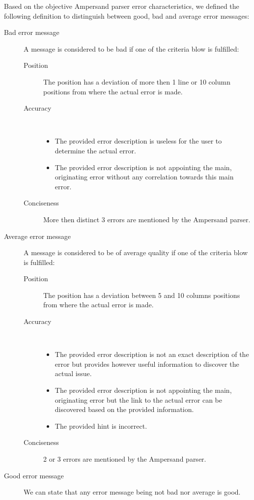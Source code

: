%
Based on the objective Ampersand parser error characteristics, we defined the following definition to distinguish between good, bad and average error messages:
%
\begin{description}
	\item [Bad error message] A message is considered to be bad if one of the criteria blow is fulfilled:
		\begin{description}
			\item [Position]
			The position has a deviation of more then 1 line or 10 column positions from where the actual error is made.
			\item [Accuracy]~
				\begin{itemize}
					\item 	The provided error description is useless for the user to determine the actual error.
					\item 	The provided error description is not appointing the main, originating error without any correlation towards this main error.
				\end {itemize}
			\item[Conciseness]
			More then distinct 3 errors are mentioned by the Ampersand parser.
		\end {description}
	\item [Average error message] A message is considered to be of average quality if one of the criteria blow is fulfilled:
		\begin{description}
			\item [Position]
			The position has a deviation between 5 and 10 columns positions from where the actual error is made.
			\item [Accuracy]~
				\begin{itemize}
					\item 	The provided error description is not an exact description of the error but provides however useful information to discover the actual issue.
					\item 	The provided error description is not appointing the main, originating error but the link to the actual error can be discovered based on the provided information.
					\item 	The provided hint is incorrect.
				\end {itemize}
			\item[Conciseness]
			2 or 3 errors are mentioned by the Ampersand parser.
		\end {description}
		
	\item [Good error message] We can state that any error message being not bad nor average is good.
\end {description}

